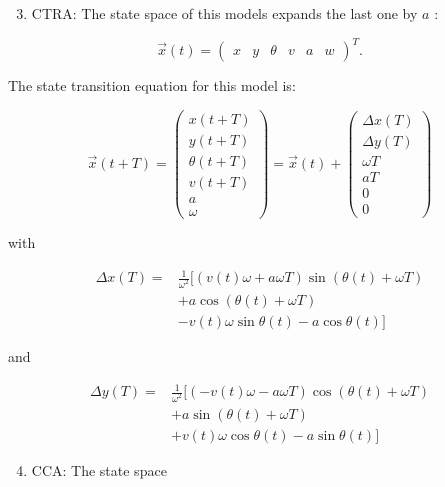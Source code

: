 \begin{enumerate}
	\setcounter{enumi}{2}
	\item CTRA: The state space of this models expands the last one by $a$ :
\end{enumerate}

$$
\vec{x}(t)=\left(\begin{array}{llllll}
	x & y & \theta & v & a & w
\end{array}\right)^{T} .
$$

The state transition equation for this model is:

$$
\vec{x}(t+T)=\left(\begin{array}{c}
	x(t+T) \\
	y(t+T) \\
	\theta(t+T) \\
	v(t+T) \\
	a \\
	\omega
\end{array}\right)=\vec{x}(t)+\left(\begin{array}{c}
	\Delta x(T) \\
	\Delta y(T) \\
	\omega T \\
	a T \\
	0 \\
	0
\end{array}\right)
$$

with

$$
\begin{aligned}
	\Delta x(T)= & \frac{1}{\omega^{2}}[(v(t) \omega+a \omega T) \sin (\theta(t)+\omega T) \\
	& +a \cos (\theta(t)+\omega T) \\
	& -v(t) \omega \sin \theta(t)-a \cos \theta(t)]
\end{aligned}
$$

and

$$
\begin{aligned}
	\Delta y(T)= & \frac{1}{\omega^{2}}[(-v(t) \omega-a \omega T) \cos (\theta(t)+\omega T) \\
	& +a \sin (\theta(t)+\omega T) \\
	& +v(t) \omega \cos \theta(t)-a \sin \theta(t)]
\end{aligned}
$$

\begin{enumerate}
	\setcounter{enumi}{3}
	\item CCA: The state space
\end{enumerate}

